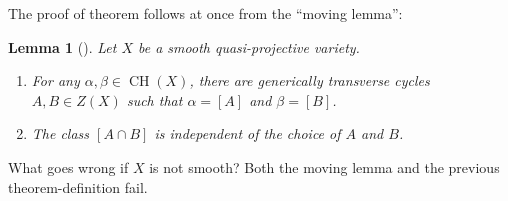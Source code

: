 \documentclass[12pt,a4paper]{amsart}
\theoremstyle{plain}
\newtheorem{lm}[thm]{Lemma}
\theoremstyle{definition}
\theoremstyle{remark}
\begin{document}
The proof of theorem follows at once from the ``moving lemma'':

\begin{lm}[{\cite{ful98}}]
    Let $X$ be a smooth quasi-projective variety.
    \begin{enumerate}[label=\roman*)]
	\item For any $\alpha,\beta\in \operatorname{CH}(X)$, there are generically transverse cycles $A,B\in Z(X)$ such that $\alpha=[A]$ and $\beta=[B]$.
	\item The class $[A\cap B]$ is independent of the choice of $A$ and $B$.
    \end{enumerate}
\end{lm}

What goes wrong if $X$ is not smooth?
Both the moving lemma and the previous theorem-definition fail.
\end{document}
